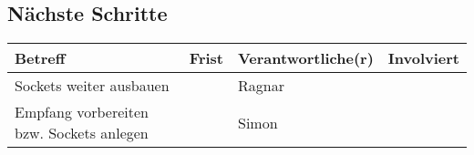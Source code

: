 \documentclass{scrartcl}
\begin{document}
\subsection{Nächste Schritte}
\begin{tabular}{L{.249} L{.2} L{.25} L{.25}}
Betreff & Frist & Verantwortliche(r) & Involviert\\\hline

Sockets weiter ausbauen & & Ragnar & \\
Empfang vorbereiten bzw. Sockets anlegen & & Simon & \\
\end{tabular}
\end{document}
